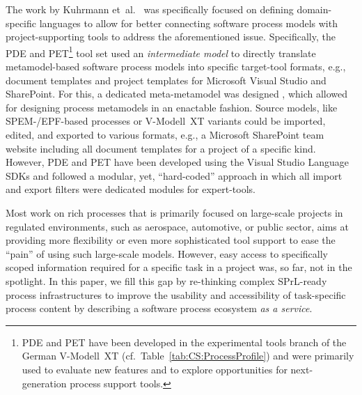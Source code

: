The work by Kuhrmann et~al.\ \cite{kktw2010a,DBLP:journals/emisaij/KuhrmannKK13,DBLP:journals/scp/KuhrmannKT14} was specifically focused on defining domain-specific languages to allow for better connecting software process models with project-supporting tools to address the aforementioned issue. Specifically, the PDE and PET\footnote{PDE and PET have been developed in the experimental tools branch of the German V-Modell~XT (cf.\ Table~\ref{tab:CS:ProcessProfile}) and were primarily used to evaluate new features and to explore opportunities for next-generation process support tools.} tool set \cite{kktw2010a} used an \emph{intermediate model} to directly translate metamodel-based software process models into specific target-tool formats, e.g., document templates and project templates for Microsoft Visual Studio and SharePoint. For this, a dedicated meta-metamodel was designed \cite{DBLP:journals/emisaij/KuhrmannKK13}, which allowed for designing process metamodels in an enactable fashion. Source models, like SPEM-/EPF-based processes \cite{OMG2005,eclipse-process-framework} or V-Modell~XT variants \cite{DBLP:journals/jss/KuhrmannTFRB16} could be imported, edited, and exported to various formats, e.g., a Microsoft SharePoint team website including all document templates for a project of a specific kind. However, PDE and PET have been developed using the Visual Studio Language SDKs and followed a modular, yet, ``hard-coded'' approach in which all import and export filters were dedicated modules for expert-tools.

Most work on rich processes that is primarily focused on large-scale projects in regulated environments, such as aerospace, automotive, or public sector, aims at providing more flexibility or even more sophisticated tool support to ease the ``pain'' of using such large-scale models. However, easy access to specifically scoped information required for a specific task in a project was, so far, not in the spotlight. In this paper, we fill this gap by re-thinking complex SPrL-ready process infrastructures to improve the usability and accessibility of task-specific process content by describing a software process ecosystem \emph{as a service}.